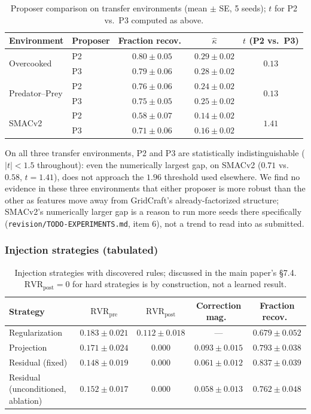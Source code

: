 \documentclass[11pt]{article}
\theoremstyle{plain}
\theoremstyle{definition}
\theoremstyle{remark}
\begin{document}
\begin{table}[h]
\centering\small
\caption{Proposer comparison on transfer environments (mean $\pm$ SE, 5 seeds); $t$ for P2 vs.\ P3 computed as above.}
\label{tab:transfer}
\begin{tabular}{@{}llccc@{}}
\toprule
Environment & Proposer & Fraction recov.\ & $\hat\kappa$ & $t$ (P2 vs.\ P3) \\
\midrule
\multirow{2}{*}{Overcooked} & P2 & $0.80\pm0.05$ & $0.29\pm0.02$ & \multirow{2}{*}{$0.13$} \\
 & P3 & $0.79\pm0.06$ & $0.28\pm0.02$ & \\
\multirow{2}{*}{Predator--Prey} & P2 & $0.76\pm0.06$ & $0.24\pm0.02$ & \multirow{2}{*}{$0.13$} \\
 & P3 & $0.75\pm0.05$ & $0.25\pm0.02$ & \\
\multirow{2}{*}{SMACv2} & P2 & $0.58\pm0.07$ & $0.14\pm0.02$ & \multirow{2}{*}{$1.41$} \\
 & P3 & $0.71\pm0.06$ & $0.16\pm0.02$ & \\
\bottomrule
\end{tabular}
\end{table}

On all three transfer environments, P2 and P3 are statistically indistinguishable ($|t|<1.5$ throughout): even the numerically largest gap, on SMACv2 ($0.71$ vs.\ $0.58$, $t=1.41$), does not approach the $1.96$ threshold used elsewhere. We find no evidence in these three environments that either proposer is more robust than the other as features move away from GridCraft's already-factorized structure; SMACv2's numerically larger gap is a reason to run more seeds there specifically (\texttt{revision/TODO-EXPERIMENTS.md}, item 6), not a trend to read into as submitted.

\subsubsection{Injection strategies (tabulated)}

\begin{table}[h]
\centering\small
\caption{Injection strategies with discovered rules; discussed in the main paper's \S7.4. $\mathrm{RVR}_{\mathrm{post}}=0$ for hard strategies is by construction, not a learned result.}
\label{tab:injection}
\begin{tabular}{@{}lcccc@{}}
\toprule
Strategy & $\mathrm{RVR}_{\mathrm{pre}}$ & $\mathrm{RVR}_{\mathrm{post}}$ & Correction mag.\ & Fraction recov.\ \\
\midrule
Regularization & $0.183\pm0.021$ & $0.112\pm0.018$ & --- & $0.679\pm0.052$ \\
Projection & $0.171\pm0.024$ & $0.000$ & $0.093\pm0.015$ & $0.793\pm0.038$ \\
Residual (fixed) & $0.148\pm0.019$ & $0.000$ & $0.061\pm0.012$ & $0.837\pm0.039$ \\
Residual (unconditioned, ablation) & $0.152\pm0.017$ & $0.000$ & $0.058\pm0.013$ & $0.762\pm0.048$ \\
\bottomrule
\end{tabular}
\end{table}
\end{document}
